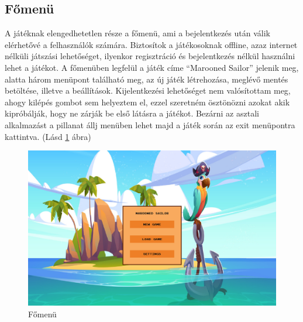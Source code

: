 \subsection{Főmenü}

 A játéknak elengedhetetlen része a főmenü, ami a bejelentkezés után válik elérhetővé a felhasználók számára. Biztosítok a játékosoknak offline, azaz internet nélküli játszási lehetőséget, ilyenkor regisztráció és bejelentkezés nélkül használni lehet a játékot.
A főmenüben legfelül a játék címe ``Marooned Sailor'' jelenik meg, alatta három menüpont található meg, az új játék létrehozása, meglévő mentés betöltése, illetve a beállítások. Kijelentkezési lehetőséget nem valósítottam meg, ahogy kilépés gombot sem helyeztem el, ezzel szeretném ösztönözni azokat akik kipróbálják, hogy ne zárják be első látásra a játékot. Bezárni az asztali alkalmazást a pillanat állj menüben lehet majd a játék során az exit menüpontra kattintva. (Lásd \ref{fig:Főmenü} ábra) 

\begin{figure}[hbt]
    \centering
    \includegraphics[width=14.0truecm]{images/mainmenu.png}
    \caption{Főmenü}
    \label{fig:Főmenü}
\end{figure}


